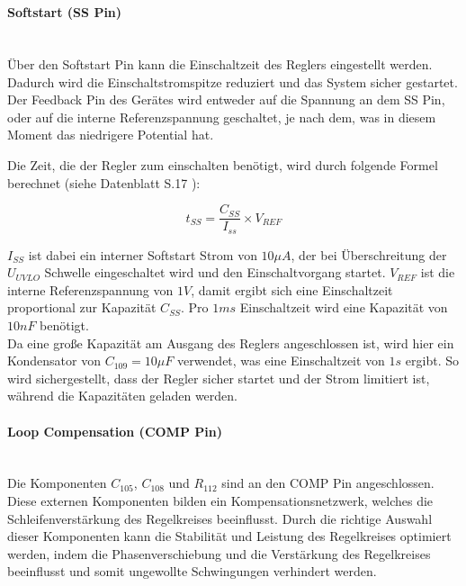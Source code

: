 \

\paragraph{Softstart (SS Pin)}\mbox{}\\
Über den Softstart Pin kann die Einschaltzeit des Reglers eingestellt werden. Dadurch wird die Einschaltstromspitze reduziert
und das System sicher gestartet. Der Feedback Pin des Gerätes wird entweder auf die Spannung an dem SS Pin, oder auf die
interne Referenzspannung geschaltet, je nach dem, was in diesem Moment das niedrigere Potential hat.

Die Zeit, die der Regler zum einschalten benötigt, wird durch folgende Formel berechnet (siehe Datenblatt S.17 \cite{LM5157}):

\[t_{SS} = \frac{C_{SS}}{I_{ss}} \times V_{REF}\]

\(I_{SS}\) ist dabei ein interner Softstart Strom von \(10\mu A\), der bei Überschreitung der \(U_{UVLO}\) Schwelle eingeschaltet
wird und den Einschaltvorgang startet. \(V_{REF}\) ist die interne Referenzspannung von \(1V\), damit ergibt sich eine Einschaltzeit
proportional zur Kapazität \(C_{SS}\). Pro \(1ms\) Einschaltzeit wird eine Kapazität von \(10nF\) benötigt. \\
Da eine große Kapazität am Ausgang des Reglers angeschlossen ist, wird hier ein Kondensator von \(C_{109} = 10\mu F\) verwendet, was
eine Einschaltzeit von \(1s\) ergibt. So wird sichergestellt, dass der Regler sicher startet und der Strom limitiert ist,
während die Kapazitäten geladen werden.

\paragraph{Loop Compensation (COMP Pin)}\mbox{}\\
Die Komponenten \(C_{105}\), \(C_{108}\) und \(R_{112}\) sind an den COMP Pin angeschlossen. Diese externen
Komponenten bilden ein Kompensationsnetzwerk, welches die Schleifenverstärkung des Regelkreises beeinflusst. Durch die 
richtige Auswahl dieser Komponenten kann die Stabilität und Leistung des Regelkreises optimiert werden, indem die 
Phasenverschiebung und die Verstärkung des Regelkreises beeinflusst und somit ungewollte Schwingungen verhindert werden.

